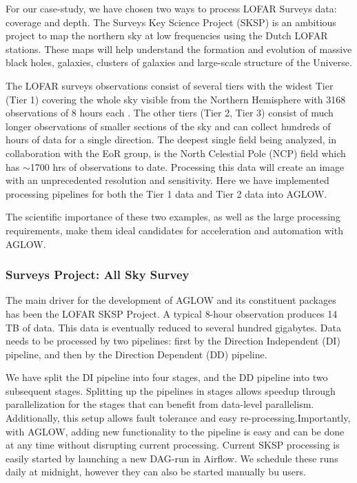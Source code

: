 For our case-study, we have chosen two ways to process LOFAR Surveys data: coverage and depth. The Surveys Key Science Project (SKSP)\cite{lotss} is an ambitious project to map the northern sky at low frequencies using the Dutch LOFAR stations. These maps will help understand the formation and evolution of massive black holes, galaxies, clusters of galaxies and large-scale structure of the Universe.  

The LOFAR surveys observations consist of several tiers with the widest Tier (Tier 1) covering the whole sky visible from the Northern Hemisphere with 3168 observations of 8 hours each \cite{lotss}. The other tiers (Tier 2, Tier 3) consist of much longer observations of smaller sections of the sky and can collect hundreds of hours of data for a single  direction. The deepest single field being analyzed, in collaboration with the EoR group, is the North Celestial Pole (NCP) field which has $\sim$1700 hrs of observations to date.  Processing this data will create an image with an unprecedented resolution and sensitivity. Here we have implemented processing pipelines for both the Tier 1 data and Tier 2 data into AGLOW. 

The scientific importance of these two examples, as well as the large processing requirements, make them ideal candidates for acceleration and automation with AGLOW.

\subsubsection{Surveys Project: All Sky Survey}\label{sec:coverage}

The main driver for the development of AGLOW and its constituent packages has been the LOFAR SKSP Project. A typical 8-hour observation produces 14 TB of data. This data is eventually reduced to several hundred gigabytes. Data needs to be processed by two pipelines: first by the Direction Independent (DI) pipeline, and then by the Direction Dependent (DD) pipeline. 

We have split the DI pipeline into four stages, and the DD pipeline into two subsequent stages. Splitting up the pipelines in stages allows speedup through parallelization for the stages that can benefit from data-level parallelism. Additionally, this setup allows fault tolerance and easy re-processing.Importantly, with AGLOW, adding new functionality to the pipeline is easy and can be done at any time without disrupting current processing. Current SKSP processing is easily started by launching a new DAG-run in Airflow. We schedule these runs daily at midnight, however they can also be started manually bu users. 

